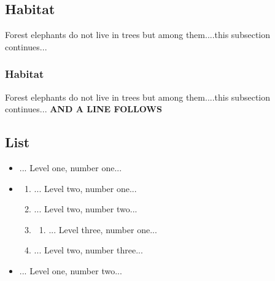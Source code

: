 \documentclass{report}
\begin{document}
 \subsection*{Habitat} \par Forest elephants do not live in trees but among them....this subsection continues... 
 \subsubsection*{Habitat} \par Forest elephants do not live in trees but among them....this subsection continues... \textbf{AND A LINE FOLLOWS}

 \subsection*{List} \begin{itemize}
\item ... Level one, number one...
\item \begin{enumerate}
\item ... Level two, number one...
\item ... Level two, number two...
\item \begin{enumerate}
\item ... Level three, number one...
\end{enumerate}

\item ... Level two, number three...
\end{enumerate}

\item ... Level one, number two...
\end{itemize}
\end{document}
